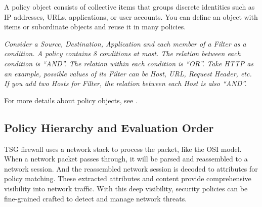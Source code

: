A policy object consists of collective items that groups discrete identities such as IP addresses, URLs, applications, or user accounts. 
You can define an object with items or subordinate objects and reuse it in many policies. 


\notemark\textit{Consider a Source, Destination, Application and each member of a Filter as a condition. A policy contains 8 conditions at most. 
The relation between each condition is “AND”. The relation within each condition is “OR”. 
Take HTTP as an example, possible values of its Filter can be Host, URL, Request Header, etc. If you add two Hosts for Filter, the relation between each Host is also “AND”.}


For more details about policy objects, see \hyperlink{link:Objects}{\color{linkblue}{Objects}}.


\subsection*{\hypertarget{link:Policy Hierarchy and Evaluation Order}{Policy Hierarchy and Evaluation Order}}
\label{sec:policies:concepts:order}

TSG firewall uses a network stack to process the packet, like the OSI model. When a network packet passes through, it will be parsed and reassembled to a network session. 
And the reassembled network session is decoded to attributes for policy matching.  
These extracted attributes and content provide comprehensive visibility into network traffic. With this deep visibility, 
security policies can be fine-grained crafted to detect and manage network threats.


